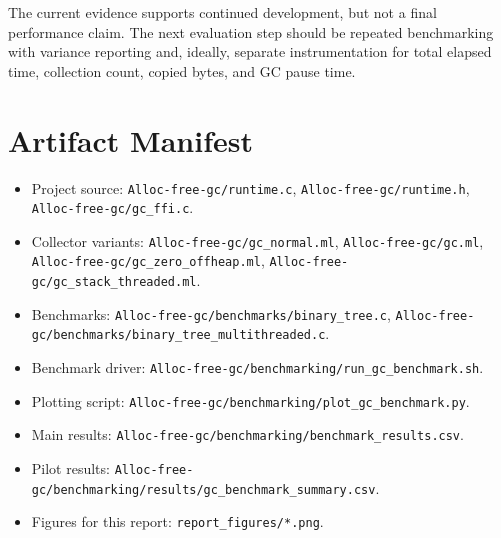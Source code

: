 \documentclass[11pt]{article}
\begin{document}
The current evidence supports continued development, but not a final
performance claim. The next evaluation step should be repeated benchmarking with
variance reporting and, ideally, separate instrumentation for total elapsed
time, collection count, copied bytes, and GC pause time.

\section*{Artifact Manifest}

\begin{itemize}
  \item Project source: \texttt{Alloc-free-gc/runtime.c},
  \texttt{Alloc-free-gc/runtime.h}, \texttt{Alloc-free-gc/gc\_ffi.c}.
  \item Collector variants: \texttt{Alloc-free-gc/gc\_normal.ml},
  \texttt{Alloc-free-gc/gc.ml},
  \texttt{Alloc-free-gc/gc\_zero\_offheap.ml},
  \texttt{Alloc-free-gc/gc\_stack\_threaded.ml}.
  \item Benchmarks: \texttt{Alloc-free-gc/benchmarks/binary\_tree.c},
  \texttt{Alloc-free-gc/benchmarks/binary\_tree\_multithreaded.c}.
  \item Benchmark driver:
  \texttt{Alloc-free-gc/benchmarking/run\_gc\_benchmark.sh}.
  \item Plotting script:
  \texttt{Alloc-free-gc/benchmarking/plot\_gc\_benchmark.py}.
  \item Main results:
  \texttt{Alloc-free-gc/benchmarking/benchmark\_results.csv}.
  \item Pilot results:
  \texttt{Alloc-free-gc/benchmarking/results/gc\_benchmark\_summary.csv}.
  \item Figures for this report: \texttt{report\_figures/*.png}.
\end{itemize}
\end{document}
